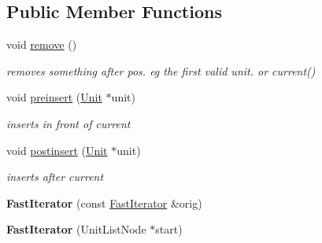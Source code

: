 \subsection*{Public Member Functions}
\begin{DoxyCompactItemize}
\item 
void \hyperlink{classUnitCollection_1_1FastIterator_a6f286f4e53cb4d663903dc9755c0bc51}{remove} ()\hypertarget{classUnitCollection_1_1FastIterator_a6f286f4e53cb4d663903dc9755c0bc51}{}\label{classUnitCollection_1_1FastIterator_a6f286f4e53cb4d663903dc9755c0bc51}

\begin{DoxyCompactList}\small\item\em removes something after pos. eg the first valid unit. or current() \end{DoxyCompactList}\item 
void \hyperlink{classUnitCollection_1_1FastIterator_a4c171a6260f99457c16bfe36203f04f8}{preinsert} (\hyperlink{classUnit}{Unit} $\ast$unit)\hypertarget{classUnitCollection_1_1FastIterator_a4c171a6260f99457c16bfe36203f04f8}{}\label{classUnitCollection_1_1FastIterator_a4c171a6260f99457c16bfe36203f04f8}

\begin{DoxyCompactList}\small\item\em inserts in front of current \end{DoxyCompactList}\item 
void \hyperlink{classUnitCollection_1_1FastIterator_a9ea5dbe8abeb95744bc4b56e6e548d1a}{postinsert} (\hyperlink{classUnit}{Unit} $\ast$unit)\hypertarget{classUnitCollection_1_1FastIterator_a9ea5dbe8abeb95744bc4b56e6e548d1a}{}\label{classUnitCollection_1_1FastIterator_a9ea5dbe8abeb95744bc4b56e6e548d1a}

\begin{DoxyCompactList}\small\item\em inserts after current \end{DoxyCompactList}\item 
{\bfseries Fast\+Iterator} (const \hyperlink{classUnitCollection_1_1FastIterator}{Fast\+Iterator} \&orig)\hypertarget{classUnitCollection_1_1FastIterator_a6f5f3b1b8c321a44a56bea1bbda74f32}{}\label{classUnitCollection_1_1FastIterator_a6f5f3b1b8c321a44a56bea1bbda74f32}

\item 
{\bfseries Fast\+Iterator} (Unit\+List\+Node $\ast$start)\hypertarget{classUnitCollection_1_1FastIterator_acf8b599b8013269cdbf9969f23a41a9e}{}\label{classUnitCollection_1_1FastIterator_acf8b599b8013269cdbf9969f23a41a9e}


\end{DoxyCompactItemize}
